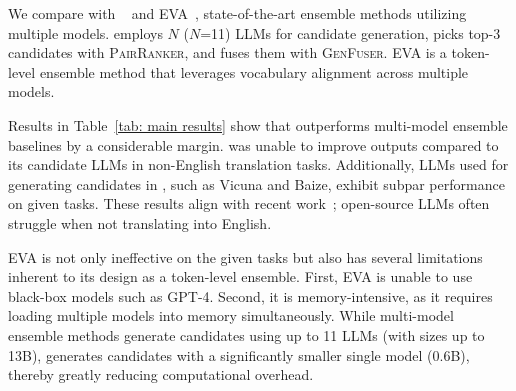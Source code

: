 We compare \ours with \blender~\cite{llm-blender} and EVA~\cite{eva}, state-of-the-art ensemble methods utilizing multiple models.
\blender employs $N$ ($N$=11) LLMs for candidate generation, picks top-3 candidates with \textsc{PairRanker}, and fuses them with \textsc{GenFuser}.
EVA is a token-level ensemble method that leverages vocabulary alignment across multiple models.





Results in Table~\ref{tab: main results} show that \ours outperforms multi-model ensemble baselines by a considerable margin.
\blender was unable to improve outputs compared to its candidate LLMs in non-English translation tasks.
Additionally, LLMs used for generating candidates in \blender, such as Vicuna and Baize, exhibit subpar performance on given tasks.
These results align with recent work~\cite{alma}; open-source LLMs often struggle when not translating into English.

EVA is not only ineffective on the given tasks but also has several limitations inherent to its design as a token-level ensemble.
First, EVA is unable to use black-box models such as GPT-4.
Second, it is memory-intensive, as it requires loading multiple models into memory simultaneously.
While multi-model ensemble methods generate candidates using up to 11 LLMs (with sizes up to 13B), \ours generates candidates with a significantly smaller single model (0.6B), thereby greatly reducing computational overhead.





